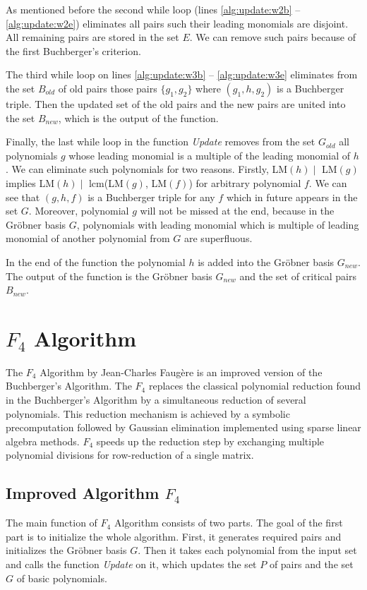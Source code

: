 As mentioned before the second while loop (lines \ref{alg:update:w2b} -- \ref{alg:update:w2e}) eliminates all pairs such their leading monomials are disjoint. All remaining pairs are stored in the set $E$. We can remove such pairs because of the first Buchberger's criterion.

The third while loop on lines \ref{alg:update:w3b} -- \ref{alg:update:w3e} eliminates from the set $B_{old}$ of old pairs those pairs $\{g_1, g_2\}$ where $(g_1, h, g_2)$ is a Buchberger triple. Then the updated set of the old pairs and the new pairs are united into the set $B_{new}$, which is the output of the function.

Finally, the last while loop in the function \textit{Update} removes from the set $G_{old}$ all polynomials $g$ whose leading monomial is a multiple of the leading monomial of $h$. We can eliminate such polynomials for two reasons. Firstly, LM$(h) \mid$ LM$(g)$ implies LM$(h) \mid$ lcm(LM$(g)$, LM$(f)$) for arbitrary polynomial $f$. We can see that $(g, h, f)$ is a Buchberger triple for any $f$ which in future appears in the set $G$. Moreover, polynomial $g$ will not be missed at the end, because in the Gr\"obner basis $G$, polynomials with leading monomial which is multiple of leading monomial of another polynomial from $G$ are superfluous.

In the end of the function the polynomial $h$ is added into the Gr\"obner basis $G_{new}$. The output of the function is the Gr\"obner basis $G_{new}$ and the set of critical pairs $B_{new}$.



\section{$F_4$ Algorithm}
The $F_4$ Algorithm \cite{F4} by Jean-Charles Faug\`ere is an improved version of the Buchberger's Algorithm. The $F_4$ replaces the classical polynomial reduction found in the Buchberger's Algorithm by a simultaneous reduction of several polynomials. This reduction mechanism is achieved by a symbolic precomputation followed by Gaussian elimination implemented using sparse linear algebra methods. $F_4$ speeds up the reduction step by exchanging multiple polynomial divisions for row-reduction of a single matrix.

\subsection{Improved Algorithm $F_4$}
The main function of $F_4$ Algorithm consists of two parts. The goal of the first part is to initialize the whole algorithm. First, it generates required pairs and initializes the Gr\"obner basis $G$. Then it takes each polynomial from the input set and calls the function \textit{Update} on it, which updates the set $P$ of pairs and the set $G$ of basic polynomials.

